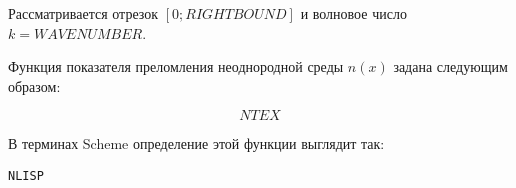 Рассматривается отрезок $[0; RIGHTBOUND]$ и волновое число $k=WAVENUMBER$.

Функция показателя преломления неоднородной среды $n(x)$ задана следующим
образом:

\begin{equation*}
NTEX
\end{equation*}

В терминах Scheme определение этой функции выглядит так:

\begin{lstlisting}[frame=tbrl,frameround=tttt]
NLISP
\end{lstlisting}